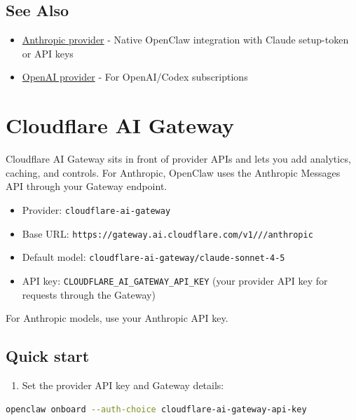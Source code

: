 \subsection{See Also}


\begin{itemize}
  \item \href{/providers/anthropic}{Anthropic provider} - Native OpenClaw integration with Claude setup-token or API keys
  \item \href{/providers/openai}{OpenAI provider} - For OpenAI/Codex subscriptions
\end{itemize}



\clearpage

\section{Cloudflare AI Gateway}


Cloudflare AI Gateway sits in front of provider APIs and lets you add analytics, caching, and controls. For Anthropic, OpenClaw uses the Anthropic Messages API through your Gateway endpoint.

\begin{itemize}
  \item Provider: \texttt{cloudflare-ai-gateway}
  \item Base URL: \texttt{https://gateway.ai.cloudflare.com/v1///anthropic}
  \item Default model: \texttt{cloudflare-ai-gateway/claude-sonnet-4-5}
  \item API key: \texttt{CLOUDFLARE\_AI\_GATEWAY\_API\_KEY} (your provider API key for requests through the Gateway)
\end{itemize}


For Anthropic models, use your Anthropic API key.

\subsection{Quick start}


\begin{enumerate}
  \item Set the provider API key and Gateway details:
\end{enumerate}


\begin{lstlisting}[language=bash]
openclaw onboard --auth-choice cloudflare-ai-gateway-api-key
\end{lstlisting}


